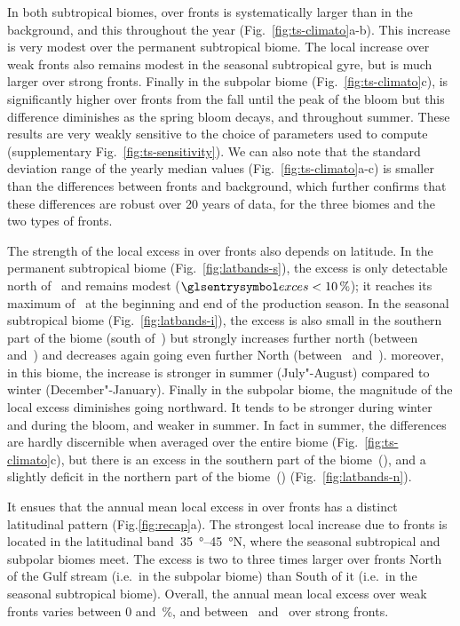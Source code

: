 In both subtropical biomes,  over fronts is systematically larger than in the background, and this throughout the year (Fig.~\ref{fig:ts-climato}a-b).
This increase is very modest over the permanent subtropical biome.
The local increase over weak fronts also remains modest in the seasonal subtropical gyre, but is much larger over strong fronts.
Finally in the subpolar biome (Fig.~\ref{fig:ts-climato}c),  is significantly higher over fronts from the fall until the peak of the bloom but this difference diminishes as the spring bloom decays, and throughout summer.
These results are very weakly sensitive to the choice of parameters used to compute  (supplementary Fig.~\ref{fig:ts-sensitivity}).
We can also note that the standard deviation range of the yearly median values (Fig.~\ref{fig:ts-climato}a-c) is smaller than the differences between fronts and background, which further confirms that these differences are robust over 20 years of data, for the three biomes and the two types of fronts.

The strength of the local excess in  over fronts also depends on latitude.
In the permanent subtropical biome (Fig.~\ref{fig:latbands-s}), the excess is only detectable north of~ and remains modest (\(\am{exces}<\pct{10}\)); it reaches its maximum of~ at the beginning and end of the production season.
In the seasonal subtropical biome (Fig.~\ref{fig:latbands-i}), the excess is also small in the southern part of the biome (south of~) but strongly increases further north (between~ and~) and decreases again going even further North (between~ and~).
moreover, in this biome, the increase is stronger in summer (July"-August) compared to winter (December"-January).
Finally in the subpolar biome, the magnitude of the local excess diminishes going northward.
It tends to be stronger during winter and during the bloom, and weaker in summer.
In fact in summer, the differences are hardly discernible when averaged over the entire biome (Fig.~\ref{fig:ts-climato}c), but there is an excess  in the southern part of the biome~(), and a slightly deficit in the northern part of the biome~() (Fig.~\ref{fig:latbands-n}).

It ensues that the annual mean local excess in  over fronts has a distinct latitudinal pattern (Fig.\ref{fig:recap}a).
The strongest local increase due to fronts is located in the latitudinal band~\qtyrange{35}{45}{\degree}N, where the seasonal subtropical and subpolar biomes meet.
The excess is two to three times larger over fronts North of the Gulf stream (i.e.\ in the subpolar biome) than South of it (i.e.\ in the seasonal subtropical biome).
Overall, the annual mean local excess over weak fronts varies between 0 and~\%, and between~ and~ over strong fronts.



